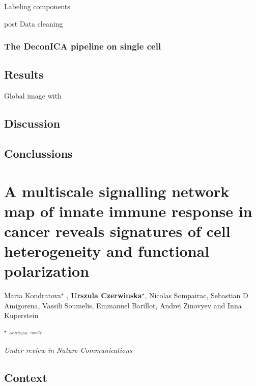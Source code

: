 \documentclass[12pt,]{book}
\theoremstyle{definition}
\theoremstyle{definition}
\theoremstyle{definition}
\theoremstyle{remark}
\begin{document}
Labeling components

post Data cleaning

\hypertarget{the-deconica-pipeline-on-single-cell}{%
\subsection{The DeconICA pipeline on single
cell}\label{the-deconica-pipeline-on-single-cell}}

\hypertarget{results-1}{%
\section{Results}\label{results-1}}

Global image with

\hypertarget{discussion}{%
\section{Discussion}\label{discussion}}

\hypertarget{conclussions}{%
\section{Conclussions}\label{conclussions}}

\hypertarget{map}{%
\chapter{A multiscale signalling network map of innate immune response
in cancer reveals signatures of cell heterogeneity and functional
polarization}\label{map}}


Maria Kondratova\(^\star\) , \textbf{Urszula Czerwinska\(^\star\)},
Nicolas Sompairac, Sebastian D Amigorena, Vassili Soumelis, Emmanuel
Barillot, Andrei Zinovyev and Inna Kuperstein

\(^\star\) \(^{_{contributed}}\) \(^{_{equally}}\)

\emph{Under review in Nature Communications}

\hypertarget{context-2}{%
\section{Context}\label{context-2}}
\end{document}
